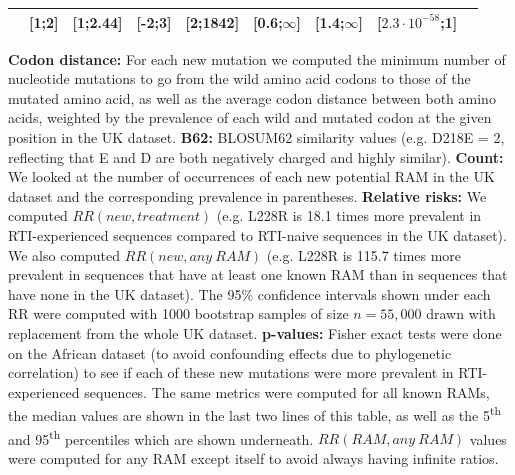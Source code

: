 \documentclass[
  11,
]{scrbook}
\begin{document}
\begin{table}[!htt]
\begin{tabular}{@{}lllllllll@{}}
  & \footnotesize{[1;2]} & \footnotesize{[1;2.44]} & \footnotesize{[-2;3]} & \footnotesize{[2;1842]} & \footnotesize{[0.6;$\infty$]}& \footnotesize{[1.4;$\infty$]}& \footnotesize{[$2.3\cdot10^{-58}$;1]}\\ \hline
\end{tabular}
\begin{flushleft}
\textbf{Codon distance:} For each new mutation we computed the minimum number of nucleotide mutations to go from the wild amino acid codons to those of the mutated amino acid, as well as the average codon distance between both amino acids, weighted by the prevalence of each wild and mutated codon at the given position in the UK  dataset.
\textbf{B62:} BLOSUM62 similarity values (e.g. D218E = 2, reflecting that E and D are both negatively charged and highly similar).
\textbf{Count:} We looked at the number of occurrences of each new potential RAM in the UK dataset and the corresponding prevalence in parentheses.
\textbf{Relative risks:} We computed $RR(new, treatment)$ (e.g. L228R is 18.1 times more prevalent in RTI-experienced sequences compared to RTI-naive sequences in the UK dataset). We also computed $RR(new, any~RAM)$ (e.g. L228R is 115.7 times more prevalent in sequences that have at least one known RAM than in sequences that have none in the UK dataset). The 95\% confidence intervals shown under each RR were computed with 1000 bootstrap samples of size $n=55,000$ drawn with replacement from the whole UK dataset.
\textbf{p-values:} Fisher exact tests were done on the African dataset (to avoid confounding effects due to phylogenetic correlation) to see if each of these new mutations were more prevalent in RTI-experienced sequences. The same metrics were computed for all known RAMs, the median values are shown in the last two lines of this table, as well as the 5\textsuperscript{th} and 95\textsuperscript{th} percentiles which are shown underneath. $RR(RAM,any~RAM)$ values were computed for any RAM except itself to avoid always having infinite ratios.
\end{flushleft}
\label{tab:tabMutations}
\end{table}
\end{document}
